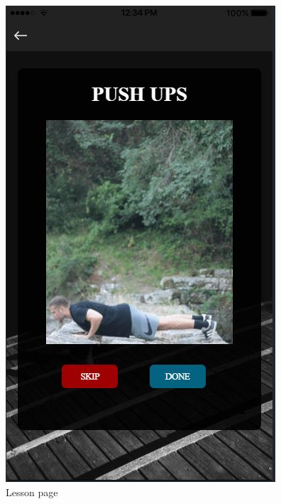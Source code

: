\documentclass[a4paper,12pt]{article}
\begin{document}
			\begin{figure}[!htb]
				\caption{Lesson page}
				\vspace*{0.5cm}

				  \includegraphics[width=\linewidth]{lesson2}
				  

\end{figure}
\end{document}
